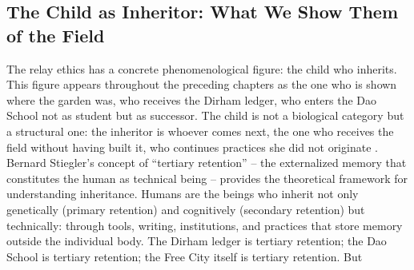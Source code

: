 \subsection{The Child as Inheritor: What We Show Them of the Field}

The relay ethics has a concrete phenomenological figure: the child who inherits. This figure appears throughout the preceding chapters as the one who is shown where the garden was, who receives the Dirham ledger, who enters the Dao School not as student but as successor. The child is not a biological category but a structural one: the inheritor is whoever comes next, the one who receives the field without having built it, who continues practices she did not originate \cite[pp.~1-25]{stiegler_1994}. Bernard Stiegler’s concept of “tertiary retention” – the externalized memory that constitutes the human as technical being – provides the theoretical framework for understanding inheritance. Humans are the beings who inherit not only genetically (primary retention) and cognitively (secondary retention) but technically: through tools, writing, institutions, and practices that store memory outside the individual body. The Dirham ledger is tertiary retention; the Dao School is tertiary retention; the Free City itself is tertiary retention. But


